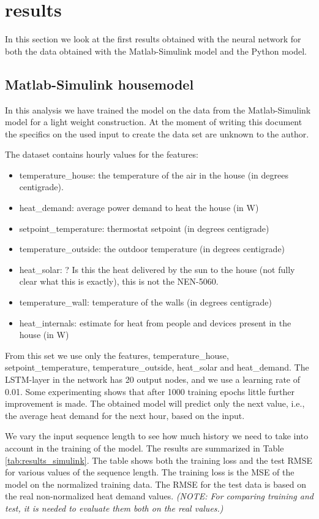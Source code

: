 \section{results}
In this section we look at the first results obtained with the neural network for both the data obtained with the Matlab-Simulink model and the Python model. 



\subsection{Matlab-Simulink housemodel}
In this analysis we have trained the model on the data from the Matlab-Simulink model for a light weight construction.  
At the moment of writing this document the specifics on the used input to create the data set are unknown to the author. 

The dataset contains hourly values for the features:
\begin{itemize}
\item temperature\_house: the temperature of the air in the house (in degrees centigrade). 
\item heat\_demand: average power demand to heat the house (in W)
\item setpoint\_temperature: thermostat setpoint (in degrees centigrade)
\item temperature\_outside: the outdoor temperature (in degrees centigrade)
\item heat\_solar: ? Is this the heat delivered by the sun to the house (not fully clear what this is exactly), this is not the NEN-5060. 
\item temperature\_wall: temperature of the walls (in degrees centigrade)
\item heat\_internals: estimate for heat from people and devices present in the house (in W) 
\end{itemize}

From this set we use only the features, temperature\_house, setpoint\_temperature, temperature\_outside, heat\_solar and heat\_demand. 
The LSTM-layer in the network has 20 output nodes, and we use a learning rate of 0.01. Some experimenting shows that after 1000 training epochs little further improvement is made. The obtained model will predict only the next value, i.e., the average heat demand for the next hour, based on the input. 

We vary the input sequence length to see how much history we need to take into account in the training of the model. The results are summarized in Table \ref{tab:results_simulink}. The table shows both the training loss and the test RMSE for various values of the sequence length. The training loss is the MSE of the model on the normalized training data. The RMSE for the test data is based on the real non-normalized heat demand values. \textit{(NOTE: For comparing training and test, it is needed to evaluate them both on the real values.)}


